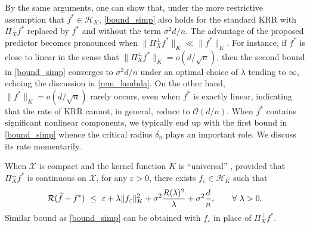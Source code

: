 \documentclass[11pt,twoside]{article}
\def\cO{\mathcal{O}}
\def\cH{\mathcal H}
\def\cR{\mathcal R}
\def\cX{\mathcal{X}}
\def\wh{\widehat}
\def\eps{\varepsilon}
\begin{document}
\begin{remark}
By the same arguments, one can show that, under the more restrictive assumption that $f^* \in \cH_K$, \eqref{bound_simp} also holds for the standard KRR with $\Pi_X^\perp f^*$ replaced by $f^*$ and without the term $\sigma^2 d/n$.  The advantage of the proposed predictor becomes pronounced when $\|\Pi_X^\perp f^*\|_K \ll \|f^*\|_K$. For instance, if  $f^*$ is close to linear in the sense that  $\|\Pi_X^\perp f^*\|_K =o(d/\sqrt n)$, then the second bound in \eqref{bound_simp} converges to $\sigma^2 d/n$ under an optimal choice of $\lambda$ tending to $\infty$, echoing the discussion in \cref{rem_lambda}. On the other hand, $\|f^*\|_K = o(d/\sqrt{n})$ rarely occurs, even when $f^*$ is exactly linear, indicating that the rate of KRR cannot, in general, reduce to $\cO(d/n)$. When $f^*$ contains significant nonlinear components, we typically end up with the first bound in \eqref{bound_simp} whence the critical radius $\delta_n$ plays an important role. We discuss its rate momentarily. 
\end{remark}


\begin{remark}\label{rem_bd_appro}
When $\cX$ is compact and the kernel function $K$ is ``universal'' \citep{micchelli2006universal}, provided that  
$\Pi_X^\perp f^*$ is continuous on $\cX$, for any $\eps >0$, there exists $f_\eps\in\cH_K$ such that
\[
    \cR(\wh f-f^*) ~ \le~      \eps + \lambda  \|f_\eps\|_K^2  + \sigma^2 \frac{R(\lambda)^2}{\lambda} + \sigma^2  {d\over n},\qquad \forall~  \lambda >0.
\]
Similar bound as \eqref{bound_simp} can be obtained with $f_\eps$ in place of $\Pi_X^\perp f^*$. 
\end{remark}
 
\end{document}
